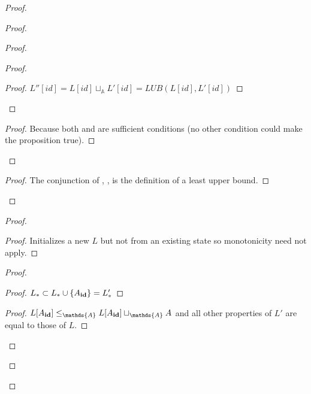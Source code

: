 \documentclass[9pt, oneside]{article}   	%
\begin{document}
\begin{proof}
\begin{proof}
\begin{proof}
\begin{proof}
				\begin{proof}
					$L''[\textit{id}] = L[\textit{id}] \sqcup_\mathds{A} L'[\textit{id}] = \textit{LUB}(L[\textit{id}], L'[\textit{id}])$
				\end{proof}
			\end{proof}
			
			\qedstep
			\begin{proof}
				Because both  and  are sufficient conditions (no other condition could make the proposition true). 
			\end{proof}
		\end{proof}
		
	
		\qedstep
		\begin{proof}
			The conjunction of , ,  is the definition of a least upper bound.
		\end{proof}
	\end{proof}

	\begin{proof}
		\begin{proof}
			Initializes a new $L$ but not from an existing state so monotonicity need not apply.
		\end{proof}
		
		\begin{proof}
			\begin{proof}
				$L_* \subset L_* \cup \{ A_{\scriptsize \textbf{id}} \} = L'_*$
			\end{proof}
			
			\begin{proof}
				$L[A_{\scriptsize \textbf{id}}] \leq_\mathds{A} L[A_{\scriptsize \textbf{id}}] \sqcup_\mathds{A} A$ and all other properties of $L'$ are equal to those of $L$.
			\end{proof}
		\end{proof}
			

\end{proof}
\end{proof}
\end{document}
